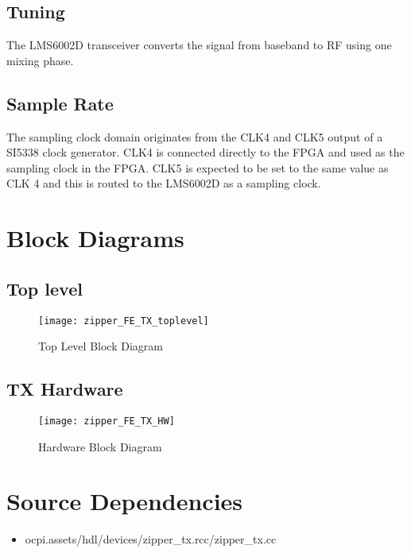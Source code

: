 \documentclass{article}
\begin{document}
\subsection*{Tuning}
The LMS6002D transceiver converts the signal from baseband to RF using one mixing phase.
\subsection*{Sample Rate}
The sampling clock domain originates from  the CLK4 and CLK5 output of a SI5338 clock generator. CLK4 is connected directly to the FPGA and used as the sampling clock in the FPGA. CLK5 is expected to be set to the same value as CLK 4 and this is routed to the LMS6002D as a sampling clock.
\newpage

\section*{Block Diagrams}
\subsection*{Top level}
\begin{figure}[ht]
	\centerline{\texttt{[image: zipper\_FE\_TX\_toplevel]}}
	\caption{Top Level Block Diagram}
	\label{fig:top}
\end{figure}
\vspace{25 mm}
\subsection*{TX Hardware}
\begin{figure}[ht]
	\centerline{\texttt{[image: zipper\_FE\_TX\_HW]}}
	\caption{Hardware Block Diagram}
	\label{fig:hw}
\end{figure}
\vspace{25 mm}
\newpage

\section*{Source Dependencies}
\begin{itemize}
	\item ocpi.assets/hdl/devices/zipper\_tx.rcc/zipper\_tx.cc
\end{itemize}
\end{document}
